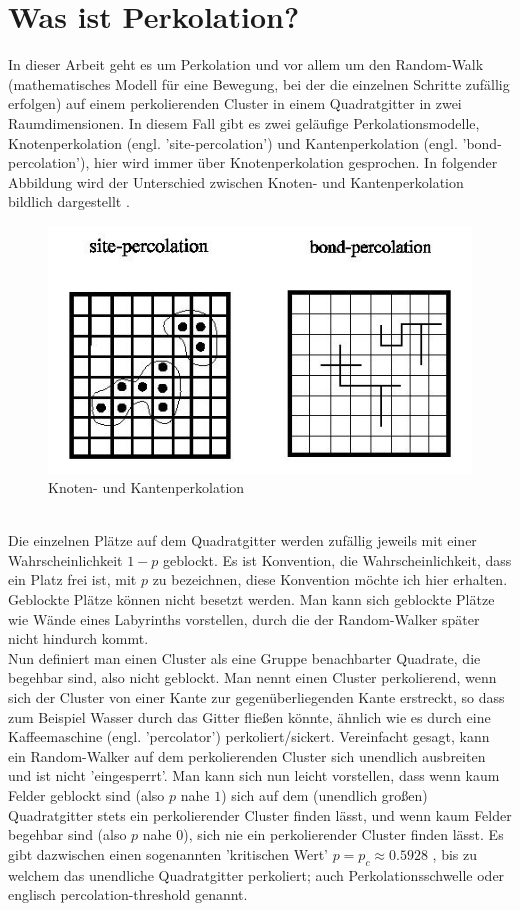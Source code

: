 \documentclass[a4paper, 12pt]{report}
\begin{document}
\section{Was ist Perkolation?}
In dieser Arbeit geht es um Perkolation und vor allem um den Random-Walk (mathematisches Modell für eine Bewegung, bei der die einzelnen Schritte zufällig erfolgen) auf einem perkolierenden Cluster in einem Quadratgitter in zwei Raumdimensionen. In diesem Fall gibt es zwei geläufige Perkolationsmodelle, Knotenperkolation (engl. 'site-percolation') und Kantenperkolation (engl. 'bond-percolation'), hier wird immer über Knotenperkolation gesprochen. In folgender Abbildung wird der Unterschied zwischen Knoten- und Kantenperkolation bildlich dargestellt \cite{Wiki_Perkolationstheorie}.
\begin{figure}[h!]
	\centering
	\includegraphics[scale=0.6]{Percolation1.jpg}
	\caption{Knoten- und Kantenperkolation}
\end{figure}
\vspace{0,5cm}
\\
Die einzelnen Plätze auf dem Quadratgitter werden zufällig jeweils mit einer Wahrscheinlichkeit $1-p$ geblockt. Es ist Konvention, die Wahrscheinlichkeit, dass ein Platz frei ist, mit $p$ zu bezeichnen, diese Konvention möchte ich hier erhalten. Geblockte Plätze können nicht besetzt werden. Man kann sich geblockte Plätze wie Wände eines Labyrinths vorstellen, durch die der Random-Walker später nicht hindurch kommt.  
\\
Nun definiert man einen Cluster als eine Gruppe benachbarter Quadrate, die begehbar sind, also nicht geblockt. Man nennt einen Cluster perkolierend, wenn sich der Cluster von einer Kante zur gegenüberliegenden Kante erstreckt, so dass zum Beispiel Wasser durch das Gitter fließen könnte, ähnlich wie es durch eine Kaffeemaschine (engl. 'percolator') perkoliert/sickert. Vereinfacht gesagt, kann ein Random-Walker auf dem perkolierenden Cluster sich unendlich ausbreiten und ist nicht 'eingesperrt'. Man kann sich nun leicht vorstellen, dass wenn kaum Felder geblockt sind (also $p$ nahe $1$) sich auf dem (unendlich großen) Quadratgitter stets ein perkolierender Cluster finden lässt, und wenn kaum Felder begehbar sind (also $p$ nahe $0$), sich nie ein perkolierender Cluster finden lässt. Es gibt dazwischen einen sogenannten 'kritischen Wert' $p=p_c \approx 0.5928$ \cite{Stauffer}, bis zu welchem das unendliche Quadratgitter perkoliert; auch Perkolationsschwelle oder englisch percolation-threshold genannt.
\end{document}
